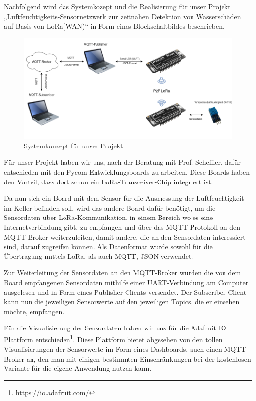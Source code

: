 Nachfolgend wird das Systemkozept und die Realisierung für unser Projekt „Luftfeuchtigkeits-Sensornetzwerk zur zeitnahen Detektion von Wasserschäden auf Basis von LoRa(WAN)“ in Form eines Blockschaltbildes beschrieben. 

\begin{figure}[h]
 \centering
 \includegraphics[width=1\textwidth]{pictures/Blockschaltbild_ProNeSy}
 \caption[Systemkonzept für unser Projekt]{Systemkonzept für unser Projekt}
 \label{fig:systemkonzept}
\end{figure}

Für unser Projekt haben wir uns, nach der Beratung mit Prof. Scheffler, dafür entschieden mit den Pycom-Entwicklungsboards zu arbeiten. Diese Boards haben den Vorteil, dass dort schon ein LoRa-Transceiver-Chip integriert ist. 

Da nun sich ein Board mit dem Sensor für die Ausmessung der Luftfeuchtigkeit im Keller befinden soll, wird das andere Board dafür benötigt, um die Sensordaten über LoRa-Kommunikation, in einem Bereich wo es eine Internetverbindung gibt, zu empfangen und über das MQTT-Protokoll an den MQTT-Broker weiterzuleiten, damit andere, die an den Sensordaten interessiert sind, darauf zugreifen können. Als Datenformat wurde sowohl für die Übertragung mittels LoRa, als auch MQTT, JSON verwendet.

Zur Weiterleitung der Sensordaten an den MQTT-Broker wurden die von dem Board empfangenen Sensordaten mithilfe einer UART-Verbindung am Computer ausgelesen und in Form eines Publisher-Clients versendet. Der Subscriber-Client kann nun die jeweiligen Sensorwerte auf den jeweiligen Topics, die er einsehen möchte, empfangen.

Für die Visualisierung der Sensordaten haben wir uns für die Adafruit IO Plattform entschieden\footnote{https://io.adafruit.com/}. Diese Plattform bietet abgesehen von den tollen Visualisierungen der Sensorwerte im Form eines Dashboards, auch einen MQTT-Broker an, den man mit einigen bestimmten Einschränkungen bei der kostenlosen Variante für die eigene Anwendung nutzen kann. 
